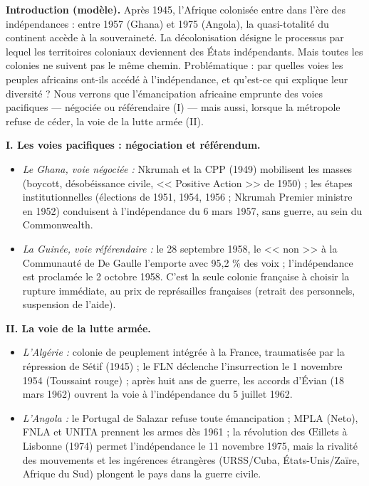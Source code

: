 \documentclass[11pt]{article}
\begin{document}
\begin{corrige}
\textbf{Introduction (modèle).} Après 1945, l'Afrique colonisée entre dans l'ère des indépendances : entre 1957 (Ghana) et 1975 (Angola), la quasi-totalité du continent accède à la souveraineté. La décolonisation désigne le processus par lequel les territoires coloniaux deviennent des États indépendants. Mais toutes les colonies ne suivent pas le même chemin. Problématique : par quelles voies les peuples africains ont-ils accédé à l'indépendance, et qu'est-ce qui explique leur diversité ? Nous verrons que l'émancipation africaine emprunte des voies pacifiques — négociée ou référendaire (I) — mais aussi, lorsque la métropole refuse de céder, la voie de la lutte armée (II).

\textbf{I. Les voies pacifiques : négociation et référendum.}
\begin{itemize}
\item \emph{Le Ghana, voie négociée :} Nkrumah et la CPP (1949) mobilisent les masses (boycott, désobéissance civile, << Positive Action >> de 1950) ; les étapes institutionnelles (élections de 1951, 1954, 1956 ; Nkrumah Premier ministre en 1952) conduisent à l'indépendance du 6 mars 1957, sans guerre, au sein du Commonwealth.
\item \emph{La Guinée, voie référendaire :} le 28 septembre 1958, le << non >> à la Communauté de De Gaulle l'emporte avec 95,2 \% des voix ; l'indépendance est proclamée le 2 octobre 1958. C'est la seule colonie française à choisir la rupture immédiate, au prix de représailles françaises (retrait des personnels, suspension de l'aide).
\end{itemize}

\textbf{II. La voie de la lutte armée.}
\begin{itemize}
\item \emph{L'Algérie :} colonie de peuplement intégrée à la France, traumatisée par la répression de Sétif (1945) ; le FLN déclenche l'insurrection le 1\ier{} novembre 1954 (Toussaint rouge) ; après huit ans de guerre, les accords d'Évian (18 mars 1962) ouvrent la voie à l'indépendance du 5 juillet 1962.
\item \emph{L'Angola :} le Portugal de Salazar refuse toute émancipation ; MPLA (Neto), FNLA et UNITA prennent les armes dès 1961 ; la révolution des Œillets à Lisbonne (1974) permet l'indépendance le 11 novembre 1975, mais la rivalité des mouvements et les ingérences étrangères (URSS/Cuba, États-Unis/Zaïre, Afrique du Sud) plongent le pays dans la guerre civile.
\end{itemize}


\end{corrige}
\end{document}
